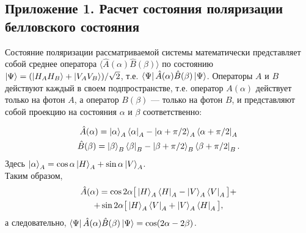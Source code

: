 \documentclass[12pt,a5paper]{article}
\numberwithin{equation}{section}
\begin{document}
\subsection{Приложение 1. Расчет состояния поляризации белловского состояния}\label{app_Bell}
Состояние поляризации рассматриваемой системы математически представляет собой среднее оператора $\langle \hat{A}(\alpha) \hat{B}(\beta) \rangle$ по состоянию
$\ket\Psi=(\ket{H_A H_B}+\ket{V_A V_B})/ \sqrt2$, т.е. $\bra{\Psi}\hat{A}(\alpha) \hat{B}(\beta)\ket{\Psi}$. Операторы $A$ и $B$ действуют каждый в своем подпространстве, т.е. оператор $A(\alpha)$ действует только на фотон $A$, а оператор $B(\beta)$ --- только на фотон $B$, и представляют собой проекцию на состояния $\alpha$ и $\beta$ соответственно:

\begin{equation}
\begin{gathered}
\hat{A}(\alpha) = \ket{\alpha}_A \bra{\alpha}_A - \ket{\alpha + \pi/2}_A \bra{\alpha+\pi/2}_A \\
\hat{B}(\beta) = \ket{\beta}_B \bra{\beta}_B - \ket{\beta + \pi/2}_B \bra{\beta+\pi/2}_B.
\label{operators_Bell}
\end{gathered}
\end{equation}
Здесь $\ket{\alpha}_A = \cos \alpha \ket{H}_A + \sin \alpha \ket{V}_A$.\\
Таким образом,
\begin{equation}
\begin{gathered}
\hat{A}(\alpha) = \cos 2\alpha \big[\ket{H}_A \bra{H}_A - \ket{V}_A \bra{V}_A \big] + \\
           + \sin 2\alpha \big[\ket{H}_A \bra{V}_A + \ket{V}_A \bra{H}_A \big],
\label{operators_Bell_2}
\end{gathered}
\end{equation}
а следовательно, $ \bra{\Psi}\hat{A}(\alpha) \hat{B}(\beta)\ket{\Psi} = \cos (2\alpha - 2\beta)$.
\end{document}
